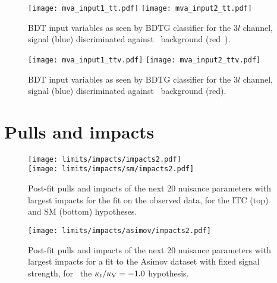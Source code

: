 \begin{figure} [!h]
  \centering
  \texttt{[image: mva\_input1\_tt.pdf]}
  \texttt{[image: mva\_input2\_tt.pdf]}
  \caption[BDT input variables. Discrimination against \ttbar in $3l$ channel.]{BDT input variables as seen by BDTG classifier for the $3l$ channel, \tHq signal (blue) discriminated against \ttbar\ background (red\
    ).}
  \label{mva_input_tt}
\end{figure}

\begin{figure} [!h]
  \centering
  \texttt{[image: mva\_input1\_ttv.pdf]}
  \texttt{[image: mva\_input2\_ttv.pdf]}
  \caption[BDT input variables. Discrimination against \ttV\ in $3l$ channel.]{BDT input variables as seen by BDTG classifier for the $3l$ channel, \tHq signal (blue) discriminated against \ttV\ background (red).}
\label{mva_input_ttv}
\end{figure}

\clearpage
\section{Pulls and impacts}\label{pulls_impacts_add}

\begin{figure} [!th]
  \centering
  
  \texttt{[image: limits/impacts/impacts2.pdf]}\\
   \texttt{[image: limits/impacts/sm/impacts2.pdf]}
  \caption[Additional post-fit pulls and impacts.]{Post-fit pulls and impacts of the next 20 nuisance parameters with largest impacts for the fit on the observed data, for the ITC (top) and SM (bottom) hypotheses.}
  \label{fig:impacts}
\end{figure}

  \begin{figure} [!h]
    \centering
    \texttt{[image: limits/impacts/asimov/impacts2.pdf]}\\
    \caption[Additional post-fit pulls an impacts for a fit to the Asimov dataset.]{Post-fit pulls and impacts of the next 20 nuisance parameters with largest impacts for a fit to the Asimov dataset with fixed signal strength, for \
      the $\kappa_t/\kappa_\text{V}=-1.0$ hypothesis.}
    \label{fig:impacts_asimov}
  \end{figure}

  







\vspace{15cm}

\newpage

